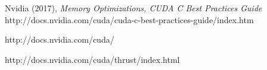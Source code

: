 \documentclass[a4paper]{amsart}
\begin{document}
\begin{thebibliography}{99}
 Nvidia (2017), {\em Memory Optimizations, CUDA C Best Practices Guide} http://docs.nvidia.com/cuda/cuda-c-best-practices-guide/index.htm

http://docs.nvidia.com/cuda/

http://docs.nvidia.com/cuda/thrust/index.html






\end{thebibliography}
\end{document}
